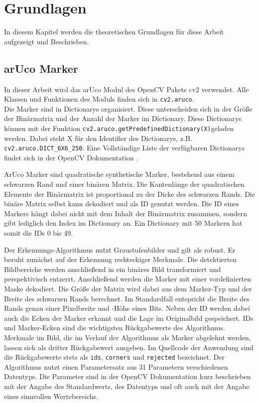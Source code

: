 ﻿\chapter{Grundlagen}

In diesem Kapitel werden die theoretischen Grundlagen für diese Arbeit aufgezeigt und Beschrieben. 

\section{arUco Marker}\label{arucoMarker}



In dieser Arbeit wird das arUco Modul des OpenCV Pakets cv2 verwendet.
Alle Klassen und Funktionen des Moduls finden sich in \verb|cv2.aruco|. \\
Die Marker sind in Dictionarys organisiert. Diese unterscheiden sich in der Größe der Binärmatrix und der Anzahl der Marker im Dictionary.
Diese Dictionarys können mit der Funktion \verb|cv2.aruco.getPredefinedDictionary(X)|geladen werden. 
Dabei steht X für den Identifier des Dictionarys, z.B. \verb|cv2.aruco.DICT_6X6_250|.
Eine Vollständige Liste der verfügbaren Dictionarys findet sich in der OpenCV Dokumentation \cite[OpenCV]{OpenCVaruco}. 

ArUco Marker sind quadratische synthetische Marker, bestehend aus einem schwarzen Rand und einer binären Matrix. 
Die Kantenlänge der quadratischen Elemente der Binärmatrix ist proportional zu der Dicke des schwarzen Rands. 
Die binäre Matrix selbst kann dekodiert und als ID genutzt werden. 
Die ID eines Markers hängt dabei nicht mit dem Inhalt der Binärmatrix zusammen, sondern gibt lediglich den Index im Dictionary an.
Ein Dictionary mit 50 Markern hat somit die IDs 0 bis 49.

Der Erkennungs-Algorithmus nutzt Graustufenbilder und gilt als robust. 
Er beruht zunächst auf der Erkennung rechteckiger Merkmale. 
Die detektierten Bildbereiche werden anschließend in ein binäres Bild transformiert und perspektivisch entzerrt. 
Anschließend werden die Marker mit einer vordefinierten Maske dekodiert.
Die Größe der Matrix wird dabei aus dem Marker-Typ und der Breite des schwarzen Rands berechnet.
Im Standardfall entspricht die Breite des Rands genau einer Pixelbreite und -Höhe eines Bits. 
Neben der ID werden dabei auch die Ecken der Marker erkannt und die Lage im Originalbild gespeichert. 
IDs und Marker-Ecken sind die wichtigsten Rückgabewerte des Algorithmus.
Merkmale im Bild, die im Verlauf der Algorithmus als Marker abgelehnt werden, lassen sich als dritter Rückgabewert ausgeben.
Im Quellcode der Anwendung sind die Rückgabewerte stets als \verb|ids|, \verb|corners| und \verb|rejected| bezeichnet.
Der Algorithmus nutzt einen Parametersatz aus 31 Parametern verschiedenen Datentyps. 
Die Parameter sind in der OpenCV Dokumentation kurz beschrieben mit der Angabe des Standardwerts, des Datentyps und oft auch mit der Angabe eines sinnvollen Wertebereichs. 

